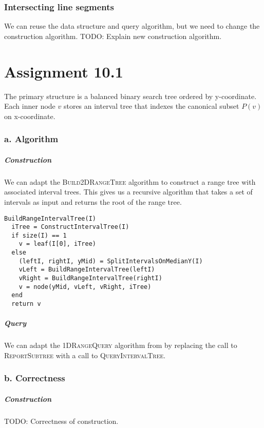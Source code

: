 \documentclass[10pt,a4paper,final,oneside,openany,article,oldfontcommands]{memoir}
\begin{document}
\subsection*{Intersecting line segments}
We can reuse the data structure and query algorithm, but we need to change the construction algorithm. TODO: Explain new construction algorithm.




\chapter*{Assignment 10.1}
The primary structure is a balanced binary search tree ordered by y-coordinate. Each inner node $v$ stores an interval tree that indexes the canonical subset $P(v)$ on x-coordinate.

\subsection*{a. Algorithm}

\paragraph{Construction}
We can adapt the \textsc{Build2DRangeTree} algorithm to construct a range tree with associated interval trees. This gives us a recursive algorithm that takes a set of intervals as input and returns the root of the range tree.
\begin{verbatim}
BuildRangeIntervalTree(I)  
  iTree = ConstructIntervalTree(I)
  if size(I) == 1
    v = leaf(I[0], iTree)
  else
    (leftI, rightI, yMid) = SplitIntervalsOnMedianY(I)
    vLeft = BuildRangeIntervalTree(leftI)
    vRight = BuildRangeIntervalTree(rightI)
    v = node(yMid, vLeft, vRight, iTree)
  end
  return v
\end{verbatim}

\paragraph{Query}
We can adapt the \textsc{ 1DRangeQuery} algorithm from \cite{deBerg} by replacing the call to \textsc{ ReportSubtree} with a call to \textsc{ QueryIntervalTree}.


\subsection*{b. Correctness}
\paragraph{Construction}
TODO: Correctness of construction.
\end{document}
